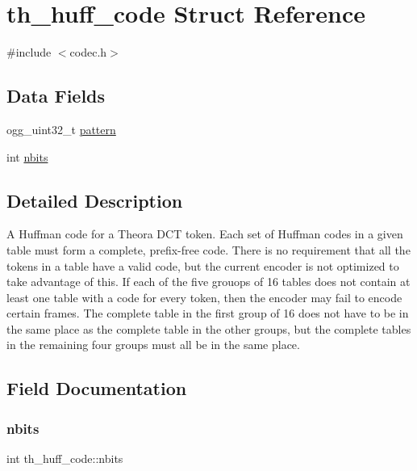 \hypertarget{structth__huff__code}{}\section{th\+\_\+huff\+\_\+code Struct Reference}
\label{structth__huff__code}


{\ttfamily \#include $<$codec.\+h$>$}

\subsection*{Data Fields}
\begin{DoxyCompactItemize}
\item 
ogg\+\_\+uint32\+\_\+t \hyperlink{structth__huff__code_a6dd29e3aa5a0c5a2dd5ce1f45b1162b4}{pattern}
\item 
int \hyperlink{structth__huff__code_aaf97b8f2f90042f7bc136a7b2bc35e35}{nbits}
\end{DoxyCompactItemize}


\subsection{Detailed Description}
A Huffman code for a Theora D\+CT token. Each set of Huffman codes in a given table must form a complete, prefix-\/free code. There is no requirement that all the tokens in a table have a valid code, but the current encoder is not optimized to take advantage of this. If each of the five grouops of 16 tables does not contain at least one table with a code for every token, then the encoder may fail to encode certain frames. The complete table in the first group of 16 does not have to be in the same place as the complete table in the other groups, but the complete tables in the remaining four groups must all be in the same place. 

\subsection{Field Documentation}
\mbox{\label{structth__huff__code_aaf97b8f2f90042f7bc136a7b2bc35e35}} 
\subsubsection{\texorpdfstring{nbits}{nbits}}
{\footnotesize\ttfamily int th\+\_\+huff\+\_\+code\+::nbits}

